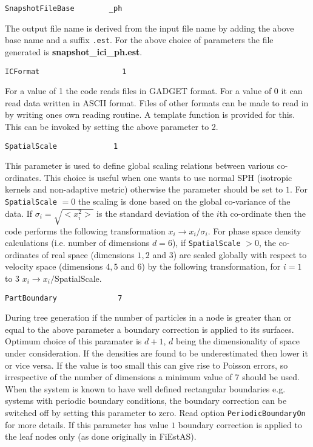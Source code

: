 \documentclass{article}
\begin{document}
\begin{verbatim}
SnapshotFileBase        _ph
\end{verbatim}
The output file name is derived from the input file name
by adding the above base name and a suffix \verb$.est$. For the above
choice of parameters the file generated is
{\bf snapshot\_ici\_ph.est}. 

\begin{verbatim}
ICFormat                   1
\end{verbatim}
For a value of 1 the code reads files in 
GADGET format. For a value of 0 it can read
data written in ASCII format.
Files of other formats can be made to read in 
by writing ones own reading routine. A template 
function is provided for this. This can be invoked
by setting the above parameter to 2.


\begin{verbatim}
SpatialScale             1
\end{verbatim}
This parameter is used to define global scaling
relations between various co-ordinates.
This choice is useful when one wants to use 
normal SPH (isotropic kernels and non-adaptive metric) 
otherwise the parameter should be set to $1$.
For \verb$SpatialScale$ $=0$ the scaling is done
based on the global co-variance of the data.
If $\sigma_i=\sqrt{<x_i^2>}$ is the standard deviation of the 
$i$th co-ordinate then the code performs the following transformation
$x_i \rightarrow x_i/\sigma_i$. 
For phase space density calculations (i.e. number of dimensions $d=6$),
if \verb$SpatialScale$ $> 0$, the co-ordinates of real space 
(dimensions $1,2$ and $3$) are scaled globally with 
respect to velocity space (dimensions $4,5$ and $6$) by the following
transformation,  for $i=1$ to $3$ $x_i \rightarrow x_i/$SpatialScale.

\begin{verbatim}
PartBoundary              7
\end{verbatim}
During tree generation if the number of particles in a node is
greater than or equal to the above parameter 
a boundary correction is applied to its surfaces. 
Optimum choice of this paramater is $d+1$, $d$ being the dimensionality 
of space under consideration.  
If  the densities are found to be underestimated then lower it or vice versa.  
If the value is too small this can give rise to Poisson errors, so 
irrespective of the number of dimensions  a minimum  value of $7$ 
should be used.
When the system is known to have 
well defined rectangular boundaries e.g. 
systems with periodic boundary conditions, 
the boundary correction can be switched
off by setting this parameter to zero.  Read option  
\verb$PeriodicBoundaryOn$ for more details.
If this parameter has value $1$ boundary correction is 
applied to the leaf nodes only (as done originally in FiEstAS).
\end{document}
